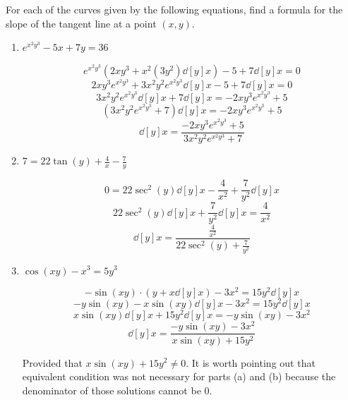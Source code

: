 \documentclass[nooutcomes,handout]{ximera}
\begin{document}
\begin{problem}
  For each of the curves given by the following equations, find a formula for the slope of the tangent line at a point $(x, y)$.

	\begin{enumerate}
	
	\item  $e^{x^2 y^3} - 5x + 7y = 36$
			\begin{freeResponse}
			$$ e^{x^2 y^3} \left( 2xy^3 + x^2 (3y^2)\dd[y]{x} \right) - 5 + 7\dd[y]{x} = 0 $$
			$$ 2xy^3 e^{x^2y^3} + 3x^2y^2e^{x^2y^3}\dd[y]{x} - 5 + 7\dd[y]{x} = 0 $$
			$$ 3x^2y^2e^{x^2y^3}\dd[y]{x} + 7\dd[y]{x} = -2xy^3 e^{x^2y^3} + 5 $$
			$$ \left( 3x^2y^2e^{x^2y^3} + 7 \right) \dd[y]{x} = -2xy^3 e^{x^2y^3} + 5 $$
			$$  \dd[y]{x} = \frac{-2xy^3 e^{x^2y^3} + 5}{3x^2 y^2 e^{x^2y^3} + 7} $$
			\end{freeResponse}
			
			
			
	\item  $7 = 22 \tan(y) + \frac{4}{x} - \frac{7}{y}$
			\begin{freeResponse}
			$$ 0 = 22 \sec^2 (y) \dd[y]{x} - \frac{4}{x^2} + \frac{7}{y^2} \dd[y]{x} $$
			$$ 22 \sec^2(y) \dd[y]{x} + \frac{7}{y^2} \dd[y]{x} = \frac{4}{x^2} $$
			$$ \dd[y]{x} = \frac{\frac{4}{x^2}}{22 \sec^2(y) + \frac{7}{y^2}} $$
			\end{freeResponse}
			
			
			
	\item  $\cos(xy) - x^3 = 5y^3$
			\begin{freeResponse}
			$$ -\sin(xy) \cdot \left(y + x \dd[y]{x} \right) - 3x^2 = 15y^2 \dd[y]{x} $$
			$$ -y \sin(xy) - x \sin(xy) \dd[y]{x} - 3x^2 = 15y^2 \dd[y]{x} $$
			$$ x \sin(xy) \dd[y]{x} + 15y^2 \dd[y]{x} = -y \sin(xy) - 3x^2 $$
			$$ \dd[y]{x} = \frac{-y \sin(xy) - 3x^2}{x \sin(xy) + 15y^2} $$
			
			Provided that $x \sin(xy) + 15y^2 \neq 0$.  It is worth pointing out that equivalent condition was not necessary for parts (a) and (b) because the denominator of those solutions cannot be $0$.  
			\end{freeResponse}
			
			
			
	\end{enumerate}
			
			
			
		
\end{problem}
	
\end{document}
